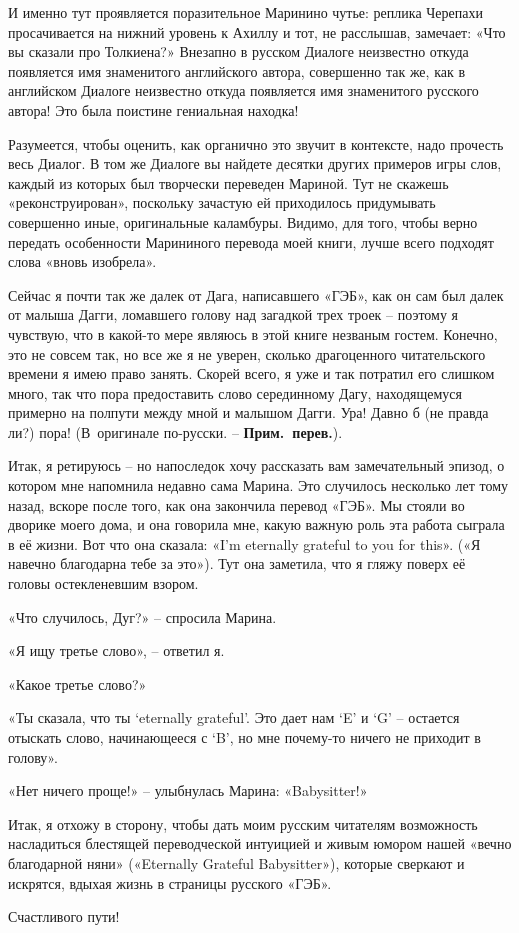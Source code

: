 \documentclass[../main.tex]{subfiles}
\begin{document}
И именно тут проявляется поразительное Маринино чутье: реплика Черепахи просачивается на нижний уровень к Ахиллу и тот, не расслышав, замечает: «Что вы сказали про Толкиена?» Внезапно в русском Диалоге неизвестно откуда появляется имя знаменитого английского автора, совершенно так же, как в английском Диалоге неизвестно откуда появляется имя знаменитого русского автора!
Это была поистине гениальная находка!

Разумеется, чтобы оценить, как органично это звучит в контексте, надо прочесть весь Диалог. В том же Диалоге вы найдете десятки других примеров игры слов, каждый из которых был творчески переведен Мариной. Тут не скажешь «реконструирован», поскольку зачастую ей приходилось придумывать совершенно иные, оригинальные каламбуры. Видимо, для того, чтобы верно передать особенности Марининого перевода моей книги, лучше всего подходят слова «вновь изобрела».

Сейчас я почти так же далек от Дага, написавшего «ГЭБ», как он сам был далек от малыша Дагги, ломавшего голову над загадкой трех троек \--- поэтому я чувствую, что в какой-то мере являюсь в этой книге незваным гостем. Конечно, это не совсем так, но все же я не уверен, сколько драгоценного читательского времени я имею право занять. Скорей всего, я уже и так потратил его слишком много, так что пора предоставить слово серединному Дагу, находящемуся примерно на полпути между мной и малышом Дагги. Ура! Давно б (не правда ли?) пора! (В~оригинале по-русски. \--- \textbf{Прим.~перев.}).

Итак, я ретируюсь \--- но напоследок хочу рассказать вам замечательный эпизод, о котором мне напомнила недавно сама Марина. Это случилось несколько лет тому назад, вскоре после того, как она закончила перевод «ГЭБ». Мы стояли во дворике моего дома, и она говорила мне, какую важную роль эта работа сыграла в её жизни. Вот что она сказала: «I'm eternally grateful to you for this». («Я навечно благодарна тебе за это»). Тут она заметила, что я гляжу поверх её головы остекленевшим взором.

«Что случилось, Дуг?» \--- спросила Марина.

«Я ищу третье слово», \--- ответил я.

«Какое третье слово?»

«Ты сказала, что ты \enquote*{eternally grateful}. Это дает нам \enquote*{E} и \enquote*{G} \--- остается отыскать слово, начинающееся с \enquote*{B}, но мне почему-то ничего не приходит в голову».

«Нет ничего проще!» \--- улыбнулась Марина: «Babysitter!»

Итак, я отхожу в сторону, чтобы дать моим русским читателям возможность насладиться блестящей переводческой интуицией и живым юмором нашей «вечно благодарной няни» («Eternally Grateful Babysitter»), которые сверкают и искрятся, вдыхая жизнь в страницы русского «ГЭБ».

\null

Счастливого пути!
\end{document}
